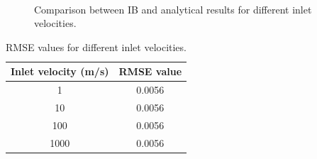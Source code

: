 \begin{figure}[H]
    \centering
    \quad
    \\
    \quad
    \caption{Comparison between IB and analytical results for different inlet velocities.}
    \label{fig:C3_penalizationResultInletVelocity}
\end{figure}

\begin{table}[H]
\centering
\begin{tabular}{c | c}
    Inlet velocity (m/s) & RMSE value \\ \hline \hline
    1 & 0.0056 \\ \hline
    10 & 0.0056 \\ \hline
    100 & 0.0056 \\ \hline
    1000 & 0.0056
\end{tabular}
\caption{RMSE values for different inlet velocities.}
\label{table:C3_penalizationResultInletVelocityRMSE}
\end{table}

